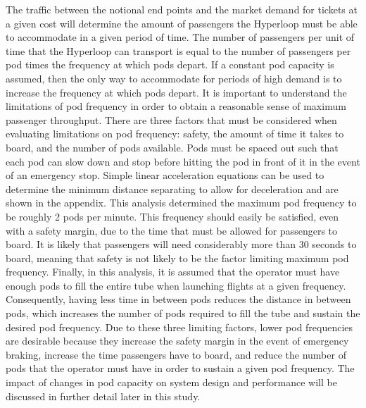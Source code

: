 The traffic between the notional end points and the market demand for tickets
at a given cost will determine the amount of passengers the Hyperloop must be
able to accommodate in a given period of time. The number of passengers per
unit of time that the Hyperloop can transport is equal to the number of
passengers per pod times the frequency at which pods depart. If a constant pod
capacity is assumed, then the only way to accommodate for periods of high
demand is to increase the frequency at which pods depart. It is important to
understand the limitations of pod frequency in order to obtain a reasonable
sense of maximum passenger throughput.
There are three factors that must be considered when evaluating limitations on
pod frequency: safety, the amount of time it takes to board, and the number of
pods available. Pods must be spaced out such that each pod can slow down and
stop before hitting the pod in front of it in the event of an emergency stop.
Simple linear acceleration equations can be used to determine the minimum
distance separating to allow for deceleration and are shown in the appendix.
This analysis determined the maximum pod frequency to be roughly 2 pods per minute.
This frequency should easily be satisfied, even with a safety margin,
due to the time that must be allowed for passengers to board.
It is likely that passengers will need
considerably more than 30 seconds to board, meaning that safety is not likely
to be the factor limiting maximum pod frequency. Finally, in this analysis,
it is assumed that the operator must have enough pods to fill the entire tube
when launching flights at a given frequency. Consequently, having less time in
between pods reduces the distance in between pods, which increases the number
of pods required to fill the tube and sustain the desired pod frequency.
Due to these three limiting factors, lower pod frequencies are desirable
because they increase the safety margin in the event of emergency braking,
increase the time passengers have to board, and reduce the number of pods that
the operator must have in order to sustain a given pod frequency. The impact of
changes in pod capacity on system design and performance will be
discussed in further detail later in this study.
